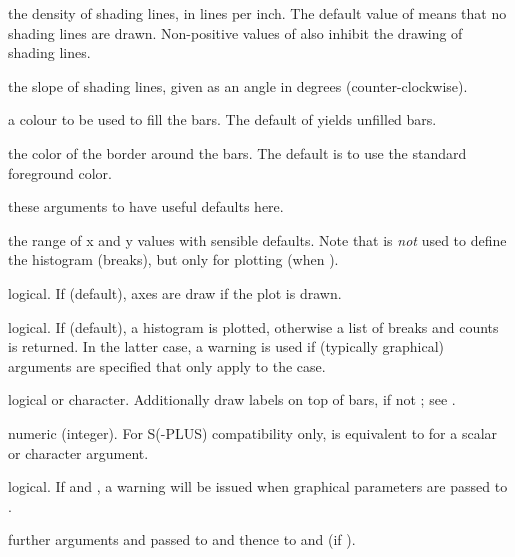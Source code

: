 \begin{Arguments}
\begin{ldescription}
\item[\code{density}] the density of shading lines, in lines per inch.
The default value of  means that no shading lines
are drawn. Non-positive values of  also inhibit the
drawing of shading lines.
\item[\code{angle}] the slope of shading lines, given as an angle in
degrees (counter-clockwise).
\item[\code{col}] a colour to be used to fill the bars.
The default of  yields unfilled bars.
\item[\code{border}] the color of the border around the bars.  The default
is to use the standard foreground color.
\item[\code{main, xlab, ylab}] these arguments to  have useful
defaults here.
\item[\code{xlim, ylim}] the range of x and y values with sensible defaults.
Note that  is \emph{not} used to define the histogram (breaks),
but only for plotting (when ).
\item[\code{axes}] logical.  If  (default), axes are draw if the
plot is drawn.
\item[\code{plot}] logical.  If  (default), a histogram is
plotted, otherwise a list of breaks and counts is returned.  In the
latter case, a warning is used if (typically graphical) arguments
are specified that only apply to the  case.
\item[\code{labels}] logical or character.  Additionally draw labels on top
of bars, if not ; see .
\item[\code{nclass}] numeric (integer).  For S(-PLUS) compatibility only,
 is equivalent to  for a scalar or
character argument. 
\item[\code{warn.unused}] logical.  If  and 
, a warning will be issued when graphical
parameters are passed to .
\item[\code{...}] further arguments and  passed to
 and thence to  and
 (if ).
\end{ldescription}
\end{Arguments}
%
